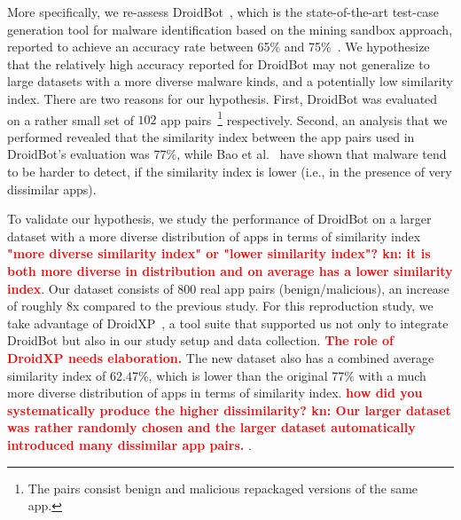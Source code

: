 More specifically, we re-assess DroidBot~\cite{DBLP:conf/wcre/BaoLL18,DBLP:journals/jss/CostaMMSSBNR22}, which is the state-of-the-art test-case generation tool for malware identification based on the mining sandbox approach,
reported to achieve an accuracy rate between 65\% and 75\%~\cite{DBLP:conf/wcre/BaoLL18,DBLP:journals/jss/CostaMMSSBNR22}. 
 We hypothesize that the relatively high accuracy reported for DroidBot 
may not generalize to large datasets with a more diverse malware kinds, and a potentially low similarity index.
There are two reasons for our hypothesis. First, DroidBot was evaluated on a rather small set of $102$ app pairs~\footnote{The pairs consist benign and malicious repackaged versions of the same app.} respectively. 
Second, an analysis that we performed revealed that the similarity index between the app pairs used in DroidBot's evaluation was $77\%$, while Bao et al.~\cite{DBLP:conf/iceccs/LeB0GL18} %
have shown that malware tend to be harder to detect, if the similarity index is lower 
(i.e., in the presence of very dissimilar apps). 

To validate our hypothesis, we study the performance of DroidBot on a larger dataset with a more diverse distribution of apps in terms of similarity index \textcolor{red}{\textbf{"more diverse similarity index" or "lower similarity index"? kn: it is both more diverse in distribution and on average has a lower similarity index}}. Our dataset consists of $800$ real app pairs (benign/malicious), an increase of roughly 8x compared to the previous study. For this reproduction study, we take advantage of DroidXP~\cite{DBLP:conf/scam/CostaMCMVBC20}, a tool suite that supported us not only to integrate DroidBot but also in our study setup and data collection. \textcolor{red}{\textbf{The role of DroidXP needs elaboration.}} The new dataset also has a combined average similarity index of $62.47\%$, which is lower than the original $77\%$ with a much more diverse distribution of apps in terms of similarity index. \textcolor{red}{\textbf{how did you systematically produce the higher dissimilarity? kn: Our larger dataset was rather randomly chosen and the larger dataset automatically introduced many dissimilar app pairs. }}. 

